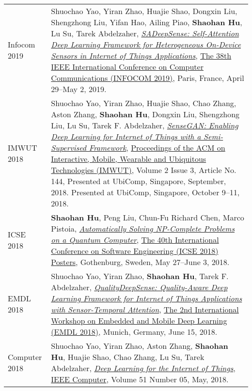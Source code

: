 \begin{longtabu}{p{.51\sectionwidth} p{.78\resumewidth}}
{\sc Infocom 2019}\hypertarget{yao2019infocom}{} &
Shuochao Yao, Yiran Zhao, Huajie Shao, Dongxin Liu, Shengzhong Liu, Yifan Hao, Ailing Piao, \textbf{Shaohan Hu}, Lu Su, Tarek Abdelzaher,
\href{https://ieeexplore.ieee.org/document/8737500}{\emph{SADeepSense: Self-Attention Deep Learning Framework for Heterogeneous On-Device Sensors in Internet of Things Applications}},
\href{https://infocom2019.ieee-infocom.org/}{\textsf{The 38th IEEE International Conference on Computer Communications (INFOCOM 2019)}},
Paris, France, April 29--May 2, 2019. \\

{\sc IMWUT 2018}\hypertarget{yao2018imwut}{} &
Shuochao Yao, Yiran Zhao, Huajie Shao, Chao Zhang, Aston Zhang, \textbf{Shaohan Hu}, Dongxin Liu, Shengzhong Liu, Lu Su, Tarek F. Abdelzaher,
\href{https://dl.acm.org/citation.cfm?id=3264954}{\emph{SenseGAN: Enabling Deep Learning for Internet of Things with a Semi-Supervised Framework}},
\href{https://imwut.acm.org/}{\textsf{Proceedings of the ACM on Interactive, Mobile, Wearable and Ubiquitous Technologies (IMWUT)}},
Volume 2 Issue 3, Article No. 144, Presented at UbiComp, Singapore, September, 2018.
Presented at UbiComp, Singapore, October 9--11, 2018. \\

{\sc ICSE 2018}\hypertarget{hu2018icse}{} &
\textbf{Shaohan Hu}, Peng Liu, Chun-Fu Richard Chen, Marco Pistoia,
\href{https://dl.acm.org/citation.cfm?id=3194959}{\emph{Automatically Solving NP-Complete Problems on a Quantum Computer}},
\href{https://www.icse2018.org/track/icse-2018-Posters}{\textsf{The 40th International Conference on Software Engineering (ICSE 2018) Posters}},
Gothenburg, Sweden, May 27--June 3, 2018. \\

{\sc EMDL 2018}\hypertarget{yao2018emdl}{} &
Shuochao Yao, Yiran Zhao, \textbf{Shaohan Hu}, Tarek F. Abdelzaher,
\href{https://dl.acm.org/citation.cfm?id=3212729}{\emph{QualityDeepSense: Quality-Aware Deep Learning Framework for Internet of Things Applications with Sensor-Temporal Attention}},
\href{https://www.sigmobile.org/mobisys/2018/workshops/deepmobile18/index.html}{\textsf{The 2nd International Workshop on Embedded and Mobile Deep Learning (EMDL 2018)}},
Munich, Germany, June 15, 2018. \\

{\sc Computer 2018}\hypertarget{yao2018computer}{} &
Shuochao Yao, Yiran Zhao, Aston Zhang, \textbf{Shaohan Hu}, Huajie Shao, Chao Zhang, Lu Su, Tarek Abdelzaher,
\href{https://ieeexplore.ieee.org/document/8364644}{\emph{Deep Learning for the Internet of Things}},
\href{https://www.computer.org/csdl/magazines/co}{\textsf{IEEE Computer}},
Volume 51 Number 05, May, 2018. \\


\end{longtabu}
